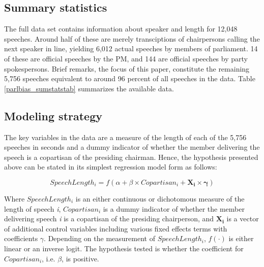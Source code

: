 \documentclass[12pt,a4paper]{article}
\begin{document}
\subsection{Summary statistics}
The full data set contains information about speaker and length for 12,048 speeches. Around half of these are merely transciptions of chairpersons calling the next speaker in line, yielding 6,012 actual speeches by members of parliament. 14 of these are official speeches by the PM, and 144 are official speeches by party spokespersons. Brief remarks, the focus of this paper, constitute the remaining 5,756 speeches equivalent to around 96 percent of all speeches in the data. Table \ref{parlbias_sumstatstab} summarizes the available data.




\subsection{Modeling strategy}
The key variables in the data are a measure of the length of each of the 5,756 speeches in seconds and a dummy indicator of whether the member delivering the speech is a copartisan of the presiding chairman. Hence, the hypothesis presented above can be stated in its simplest regression model form as follows:

\begin{equation}\label{model}
SpeechLength_i = f( \alpha + \beta \times Copartisan_i + \mathbf{X_i\times\gamma} )
\end{equation}

Where $SpeechLength_i$ is an either continuous or dichotomous measure of the length of speech \textit{i}, $Copartisan_i$ is a dummy indicator of whether the member delivering speech \textit{i} is a copartisan of the presiding chairperson, and $\mathbf{X_i}$ is a vector of additional control variables including various fixed effects terms with coefficients $\gamma$. Depending on the measurement of $SpeechLength_i$, $f(\cdot)$ is either linear or an inverse logit. The hypothesis tested is whether the coefficient for \textit{$Copartisan_i$}, i.e. \textit{$\beta$}, is positive.
\end{document}
